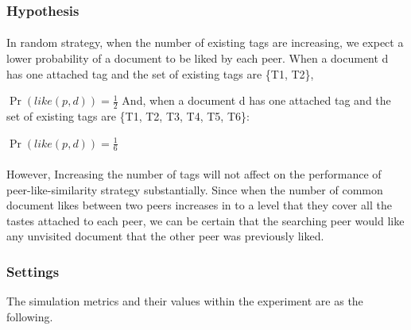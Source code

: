 \documentclass [12pt]{article} \usepackage{multicol}
\begin{document}
\subsubsection{Hypothesis} 

\paragraph{}
In random strategy, when the number of existing tags are
increasing, we expect a lower probability of a document to be liked by each peer.
When a document d has one attached tag
and the set of existing tags are \{T1, T2\},

$\Pr({like(p, d)}) = \frac{1}{2} $
\newline\newline And, when a document d has one attached tag and the set of
existing tags are \{T1, T2, T3, T4, T5, T6\}:

$\Pr({like(p, d)}) = \frac{1}{6} $

%
%

\paragraph{} However, Increasing the number of tags will not affect on the performance of peer-like-similarity strategy substantially.
Since when the number of common document likes between two peers increases in to a level that they cover all the tastes attached to each peer,
we can be certain that the searching peer would like any unvisited document that the other peer was previously liked.  


\subsubsection{Settings}

The simulation metrics and their values within the experiment are as the following.
\end{document}
